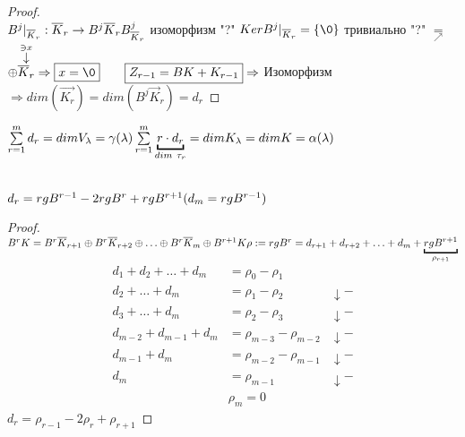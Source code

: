 \documentclass[../main.tex]{subfiles}
\begin{document}
	\begin{proof}
		\ \\
		$B^j|_{\vec K_r}: \vec K_r \rightarrow B^j \vec K_r\n
		B^j_{\vec K_r}$ изоморфизм "?"\n
		$Ker B^j|_{\vec K_r} = \{\0\}$ тривиально "?"\n
		$\underset{\nearrow}{=}$
		 $\oplus \overset{\mathlarger{\stackrel{\ni x}{\downarrow}}}{\vec K_r}
		\Rightarrow \boxed{x = \0} \quad \quad \boxed{Z_{r-1} = BK + K_{r-1}}\n
		\Rightarrow $ Изоморфизм $\Rightarrow dim(\vec{K_r}) = dim(B^j \vec K_r) = d_r$
	\end{proof}
	\begin{corollary}
		$\sum\limits_{r=1}^m d_r = dim V_\lambda = \gamma(\lambda)\n
		\sum\limits_{r=1}^m \underbracket{r\cdot d_r}_{dim \ \tau_r} = dim K_\lambda = dim K = \alpha(\lambda)$
	\end{corollary}
	\begin{corollary}
		\ \\
		$d_r = rg B^{r-1} - 2rg B^r + rg B^{r+1}\n
		(d_m = rg B^{r-1})$
	\end{corollary}
	\begin{proof} \ \\
		$B^r K = B^r \vec K_{r+1} \oplus B^r \vec K_{r+2} \oplus \ldots \oplus B^r \vec K_m \oplus B^{r+1} K\n
		\rho:= rg B^r = d_{r+1} + d_{r+2} + \ldots + d_m + \underbracket{rg B^{r+1}}_{\rho_{r+1}}
		$
		\begin{align*}
			d_1 + d_2 + \ldots + d_m &= \rho_0 - \rho_1 \\
			d_2 + \ldots + d_m &= \rho_1 - \rho_2 & \downarrow-\\
			d_3 + \ldots + d_m &= \rho_2 - \rho_3& \downarrow-\\
			d_{m-2} + d_{m-1} + d_m &= \rho_{m-3} - \rho_{m-2}& \downarrow-\\
			d_{m-1} + d_m &= \rho_{m-2} - \rho_{m-1} & \downarrow-\\
			d_m &= \rho_{m-1} & \downarrow-\\
			& \rho_m = 0
		\end{align*}
		$\boxed{d_r = \rho_{r-1} - 2\rho_r + \rho_{r+1}}$
	\end{proof}
\end{document}
